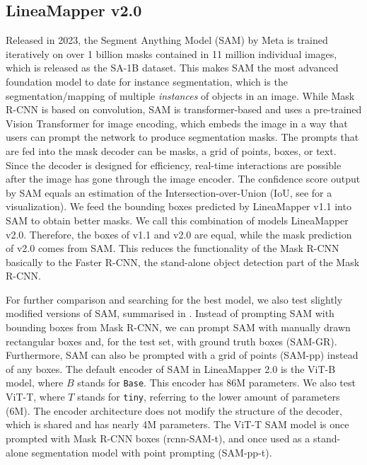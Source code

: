 \subsection{LineaMapper v2.0}\label{sec:LMv2.0}
Released in 2023, the Segment Anything Model (SAM) by Meta is trained iteratively on over 1 billion masks contained in 11 million individual images, which is released as the SA-1B dataset. This makes SAM the most advanced foundation model to date for instance segmentation, which is the segmentation/mapping of multiple \textit{instances} of objects in an image. While Mask R-CNN is based on convolution, SAM is transformer-based and uses a pre-trained Vision Transformer for image encoding, which embeds the image in a way that users can prompt the network to produce segmentation masks. The prompts that are fed into the mask decoder can be masks, a grid of points, boxes, or text. Since the decoder is designed for efficiency, real-time interactions are possible after the image has gone through the image encoder. 
The confidence score output by SAM equals an estimation of the Intersection-over-Union (IoU, see for a visualization).
We feed the bounding boxes predicted by LineaMapper v1.1 into SAM to obtain better masks. We call this combination of models LineaMapper v2.0. Therefore, the boxes of v1.1 and v2.0 are equal, while the mask prediction of v2.0 comes from SAM. This reduces the functionality of the Mask R-CNN basically to the Faster R-CNN, the stand-alone object detection part of the Mask R-CNN. 

For further comparison and searching for the best model, we also test slightly modified versions of SAM, summarised in . Instead of prompting SAM with bounding boxes from Mask R-CNN, we can prompt SAM with manually drawn rectangular boxes and, for the test set, with ground truth boxes (SAM-GR). Furthermore, SAM can also be prompted with a grid of points (SAM-pp) instead of any boxes. The default encoder of SAM in LineaMapper 2.0 is the ViT-B model, where $B$ stands for \texttt{Base}. This encoder has 86M parameters. We also test ViT-T, where $T$ stands for \texttt{tiny}, referring to the lower amount of parameters (6M). The encoder architecture does not modify the structure of the decoder, which is shared and has nearly 4M parameters. The ViT-T SAM model is once prompted with Mask R-CNN boxes (rcnn-SAM-t), and once used as a stand-alone segmentation model with point prompting (SAM-pp-t).

